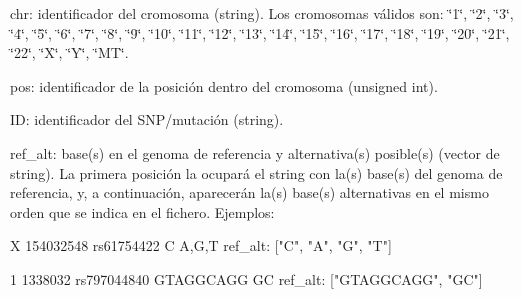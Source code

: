 \begin{DoxyItemize}
\item chr\-: identificador del cromosoma (string). Los cromosomas válidos son\-: \char`\"{}1\char`\"{}, \char`\"{}2\char`\"{}, \char`\"{}3\char`\"{}, \char`\"{}4\char`\"{}, \char`\"{}5\char`\"{}, \char`\"{}6\char`\"{}, \char`\"{}7\char`\"{}, \char`\"{}8\char`\"{}, \char`\"{}9\char`\"{}, \char`\"{}10\char`\"{}, \char`\"{}11\char`\"{}, \char`\"{}12\char`\"{}, \char`\"{}13\char`\"{}, \char`\"{}14\char`\"{}, \char`\"{}15\char`\"{}, \char`\"{}16\char`\"{}, \char`\"{}17\char`\"{}, \char`\"{}18\char`\"{}, \char`\"{}19\char`\"{}, \char`\"{}20\char`\"{}, \char`\"{}21\char`\"{}, \char`\"{}22\char`\"{}, \char`\"{}\-X\char`\"{}, \char`\"{}\-Y\char`\"{}, \char`\"{}\-M\-T\char`\"{}. \item pos\-: identificador de la posición dentro del cromosoma (unsigned int). \item I\-D\-: identificador del S\-N\-P/mutación (string). \item ref\-\_\-alt\-: base(s) en el genoma de referencia y alternativa(s) posible(s) (vector de string). La primera posición la ocupará el string con la(s) base(s) del genoma de referencia, y, a continuación, aparecerán la(s) base(s) alternativas en el mismo orden que se indica en el fichero. Ejemplos\-: 
\begin{DoxyCode}
X 154032548 rs61754422  C A,G,T
ref\_alt: [\textcolor{stringliteral}{"C"}, \textcolor{stringliteral}{"A"}, \textcolor{stringliteral}{"G"}, \textcolor{stringliteral}{"T"}]

1 1338032 rs797044840 GTAGGCAGG GC
ref\_alt: [\textcolor{stringliteral}{"GTAGGCAGG"}, \textcolor{stringliteral}{"GC"}]
\end{DoxyCode}
\end{DoxyItemize}
